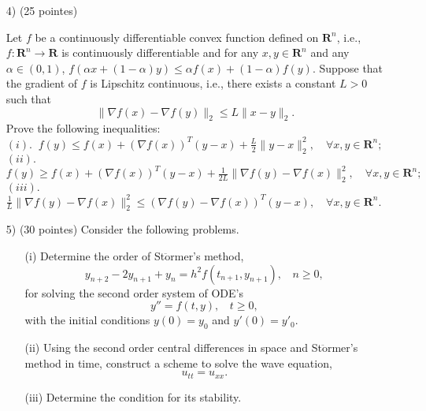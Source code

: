 \documentclass[10pt]{article}
\renewcommand{\geq}{\geqslant}
\begin{document}
\begin{enumerate}
\item[4)](25 pointes)

    Let $f$ be a continuously differentiable convex function
    defined on $\mathbf{R}^n$, i.e., $f:\mathbf{R}^n\to\mathbf{R}$ is continuously differentiable and for any $x,y\in\mathbf{R}^n$ and any $\alpha\in(0,1)$, $f(\alpha x+(1-\alpha)y)\le \alpha f(x)+(1-\alpha) f(y)$.
    Suppose that the gradient of $f$ is Lipschitz continuous, i.e., there exists a constant $L>0$ such that
    $$
    \|\nabla f(x)-\nabla f(y)\|_2\le L \|x-y\|_2.
    $$
    Prove the following inequalities:\\
    $(i).~$
    $
    f(y)\le f(x)+(\nabla f(x))^T(y-x)+\frac{L}{2}\|y-x\|^2_2,\quad\forall x,y\in\mathbf{R}^n;
    $\\
    $(ii).~$
    $
    f(y)\ge f(x)+(\nabla f(x))^T(y-x)+\frac{1}{2L}\|\nabla f(y)-\nabla f(x)\|_2^2,\quad\forall x,y\in\mathbf{R}^n;
    $\\
    $(iii).~$
    $
    \frac{1}{L}\|\nabla f(y)-\nabla f(x)\|_2^2\le (\nabla f(y)-\nabla f(x))^T(y-x),\quad\forall x,y\in\mathbf{R}^n.
    $

\item[5)](30 pointes)
Consider the following problems.
    \begin{itemize}
        \item[(i)] Determine the order of St$\ddot{\text{o}}$rmer's method,
    \begin{equation*}
    y_{n+2} - 2y_{n+1} + y_{n}
    = h^{2} f(t_{n+1}, y_{n+1}), \ \ \ \ n\geq 0,
    \end{equation*}
    for solving the second order system of ODE's
    \begin{equation*}
    y'' = f(t, y), \ \ \ \ t\geq 0,
    \end{equation*}
    with the initial conditions $y(0) = y_{0}$ and $y'(0) = y'_{0}$.

    \item[(ii)] Using the second order central differences in space and St$\ddot{\text{o}}$rmer's method in time, construct a scheme to solve the wave equation,
    \begin{equation*}
    u_{tt} = u_{xx}.
    \end{equation*}

    \item[(iii)] Determine the condition for its stability.
\end{itemize}


\end{enumerate}
\end{document}
